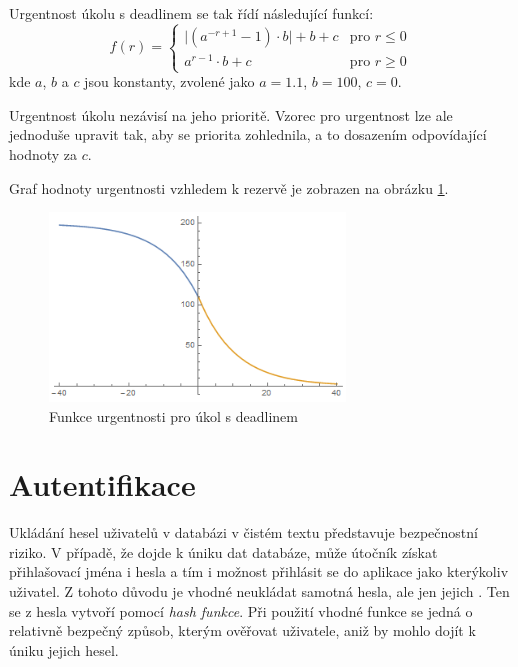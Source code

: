 \documentclass[thesis=B,czech]{FITthesis}[2012/06/26]
\begin{document}
			Urgentnost úkolu s deadlinem se tak řídí následující funkcí:
				\begin{equation}
				f(r)=
				\begin{cases}
					\lvert(a^{-r+1}-1)\cdot b \rvert +b+c& \text{pro } r\leq 0 \\
					a^{r-1}\cdot b + c& \text{pro } r\geq 0
				\end{cases}
				\end{equation}
			kde $a$, $b$ a $c$ jsou konstanty, zvolené jako $a=1.1$, $b=100$, $c=0$.

			Urgentnost úkolu nezávisí na jeho prioritě. Vzorec pro urgentnost lze ale jednoduše upravit tak, aby se priorita zohlednila, a to dosazením odpovídající hodnoty za $c$.
			
			Graf hodnoty urgentnosti vzhledem k rezervě je zobrazen na obrázku \ref{urgency-plot}.
			
			\begin{figure}\centering
				\includegraphics[width=0.7\textwidth]{resources/urgency-plot.png}
				\caption[Urgentnost úkolu s deadlinem]{Funkce urgentnosti pro úkol s deadlinem}
				\label{urgency-plot}
			\end{figure}
			


	
	\section{Autentifikace}
		Ukládání hesel uživatelů v databázi v čistém textu představuje bezpečnostní riziko. V případě, že dojde k úniku dat databáze, může útočník získat přihlašovací jména i hesla a tím i možnost přihlásit se do aplikace jako kterýkoliv uživatel. Z tohoto důvodu je vhodné neukládat samotná hesla, ale jen jejich . Ten se z hesla vytvoří pomocí \textit{hash funkce}. \cite{hash-function} Při použití vhodné funkce se jedná o relativně bezpečný způsob, kterým ověřovat uživatele, aniž by mohlo dojít k úniku jejich hesel.
		
\end{document}
